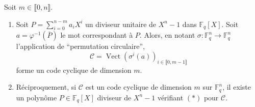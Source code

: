 	\begin{theorem}
		Soit $m \in \llbracket 0, n \rrbracket$.
		\begin{enumerate}[label=(\roman*)]
			\item Soit $P = \sum_{i=0}^{n-m} a_i X^i$ un diviseur unitaire de $X^n - 1$ dans $\mathbb{F}_q[X]$. Soit $a = \varphi^{-1}(\overline{P})$ le mot correspondant à $P$. Alors, en notant $\sigma : \mathbb{F}_q^n \rightarrow \mathbb{F}_q^n$ l'application de ``permutation circulaire'',
			\[ \mathcal{C} = \operatorname{Vect}(\sigma^{i}(a))_{i \in \llbracket 0, m-1 \rrbracket} \tag{$*$} \]
			forme un code cyclique de dimension $m$.
			\item Réciproquement, si $\mathcal{C}$ est un code cyclique de dimension $m$ sur $\mathbb{F}_q^n$, il existe un polynôme $P \in \mathbb{F}_q[X]$ diviseur de $X^n - 1$ vérifiant $(*)$ pour $\mathcal{C}$.
		\end{enumerate}
	\end{theorem}
	
